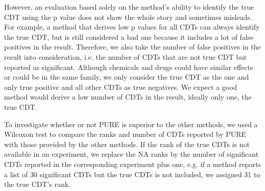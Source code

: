 However, an evaluation based solely on the method's ability to identify the true CDT using the p value does not show the whole story and sometimes misleads.
For example, a method that derives low p values for all CDTs can always identify the true CDT, but is still considered a bad one because it includes a lot of false positives in the result.
Therefore, we also take the number of false positives in the result into consideration, i.e. the number of CDTs that are not true CDT but reported as significant. %
Although chemicals and drugs could have similar effects or could be in the same family, we only consider the true CDT as the one and only true positive and all other CDTs as true negatives.
We expect a good method would derive a low number of CDTs in the result, ideally only one, the true CDT.

To investigate whether or not  PURE is superior to the other methods, we used a Wilcoxon test to compare the ranks and number of CDTs reported by PURE with those provided by the  other methods. 
If the rank of the true CDTs is not available in an experiment, we replace the NA ranks by the number of significant CDTs reported in the corresponding experiment plus one, 
e.g. if a method reports a list of 30 significant CDTs but the true CDTs is not included, we assigned 31 to the true CDT's rank.


